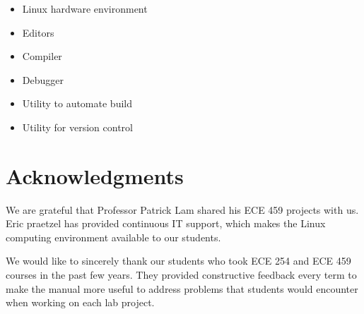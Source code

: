 \begin{itemize}
    \item Linux hardware environment
    \item Editors
    \item Compiler 
    \item Debugger 
    \item Utility to automate build
    \item Utility for version control
\end{itemize}



\section*{Acknowledgments}

We are grateful that Professor Patrick Lam shared his ECE 459  projects with us. Eric praetzel has provided continuous IT support, which makes the Linux computing environment available to our students.

We would like to sincerely thank our students who took ECE 254 and ECE 459 courses in the past few years. They provided constructive feedback every term to make the manual more useful to address problems that students would encounter when working on each lab project. 

